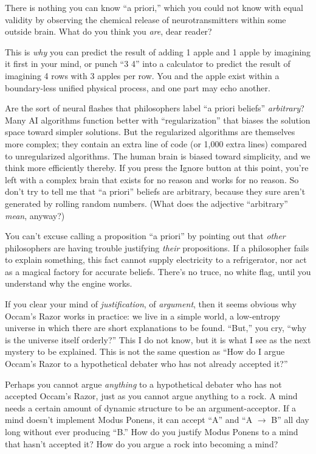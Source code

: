 {
 There is nothing you can know ``a
priori,'' which you could not know with equal
validity by observing the chemical release of neurotransmitters within
some outside brain. What do you think you \textit{are}, dear reader?}

{
 This is \textit{why} you can predict the result of adding 1 apple
and 1 apple by imagining it first in your mind, or punch
``3 {\texttimes} 4'' into a
calculator to predict the result of imagining 4 rows with 3 apples per
row. You and the apple exist within a boundary-less unified physical
process, and one part may echo another.}

{
 Are the sort of neural flashes that philosophers label
``a priori beliefs''
\textit{arbitrary}? Many AI algorithms function better with
``regularization'' that biases the
solution space toward simpler solutions. But the regularized algorithms
are themselves more complex; they contain an extra line of code (or
1,000 extra lines) compared to unregularized algorithms. The human
brain is biased toward simplicity, and we think more efficiently
thereby. If you press the Ignore button at this point,
you're left with a complex brain that exists for no
reason and works for no reason. So don't try to tell me
that ``a priori'' beliefs are
arbitrary, because they sure aren't generated by
rolling random numbers. (What does the adjective
``arbitrary'' \textit{mean},
anyway?)}

{
 You can't excuse calling a proposition
``a priori'' by pointing out that
\textit{other} philosophers are having trouble justifying
\textit{their} propositions. If a philosopher fails to explain
something, this fact cannot supply electricity to a refrigerator, nor
act as a magical factory for accurate beliefs. There's
no truce, no white flag, until you understand why the engine works.}

{
 If you clear your mind of \textit{justification}, of
\textit{argument}, then it seems obvious why Occam's
Razor works in practice: we live in a simple world, a low-entropy
universe in which there are short explanations to be found.
``But,'' you cry,
``why is the universe itself
orderly?'' This I do not know, but it is what I see
as the next mystery to be explained. This is not the same question as
``How do I argue Occam's Razor to a
hypothetical debater who has not already accepted
it?''}

{
 Perhaps you cannot argue \textit{anything} to a hypothetical
debater who has not accepted Occam's Razor, just as you
cannot argue anything to a rock. A mind needs a certain amount of
dynamic structure to be an argument-acceptor. If a mind
doesn't implement Modus Ponens, it can accept
``A'' and ``A
$\rightarrow $ B'' all day long without ever
producing ``B.'' How do you justify
Modus Ponens to a mind that hasn't accepted it? How do
you argue a rock into becoming a mind?}

